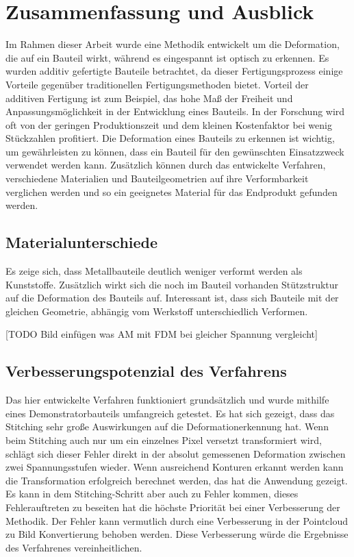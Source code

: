 
\chapter{Zusammenfassung und Ausblick}

Im Rahmen dieser Arbeit wurde eine Methodik entwickelt um 
die Deformation, die auf ein Bauteil wirkt, während es eingespannt 
ist optisch zu erkennen. Es wurden additiv gefertigte Bauteile 
betrachtet, da dieser Fertigungsprozess einige Vorteile gegenüber
traditionellen Fertigungsmethoden bietet. 
Vorteil der additiven Fertigung ist zum Beispiel, das hohe Maß der Freiheit und 
Anpassungsmöglichkeit in der Entwicklung eines Bauteils. In der Forschung 
wird oft von der geringen Produktionszeit und dem kleinen Kostenfaktor 
bei wenig Stückzahlen profitiert. Die Deformation eines Bauteils zu 
erkennen ist wichtig, um gewährleisten zu können, dass ein Bauteil für 
den gewünschten Einsatzzweck verwendet werden kann. Zusätzlich können 
durch das entwickelte Verfahren, verschiedene Materialien und Bauteilgeometrien 
auf ihre Verformbarkeit verglichen werden und so ein geeignetes Material 
für das Endprodukt gefunden werden.

\section{Materialunterschiede}

Es zeige sich, dass Metallbauteile deutlich weniger verformt werden als 
Kunststoffe. Zusätzlich wirkt sich die noch im Bauteil vorhanden Stützstruktur 
auf die Deformation des Bauteils auf. 
Interessant ist, dass sich Bauteile mit der gleichen Geometrie, abhängig vom 
Werkstoff unterschiedlich Verformen. 

[TODO Bild einfügen was AM mit FDM bei gleicher Spannung vergleicht]

\section{Verbesserungspotenzial des Verfahrens}

Das hier entwickelte Verfahren funktioniert grundsätzlich und wurde mithilfe 
eines Demonstratorbauteils umfangreich getestet. Es hat sich gezeigt, dass 
das Stitching sehr große Auswirkungen auf die Deformationerkennung hat. 
Wenn beim Stitching auch nur um ein einzelnes Pixel versetzt transformiert wird,
schlägt sich dieser Fehler direkt in der absolut gemessenen 
Deformation zwischen zwei Spannungsstufen wieder.
Wenn ausreichend Konturen erkannt werden kann die Transformation erfolgreich
berechnet werden, das hat die Anwendung gezeigt. Es kann in dem Stitching-Schritt
aber auch zu Fehler kommen, dieses Fehlerauftreten zu beseiten hat die höchste Priorität 
bei einer Verbesserung der Methodik. 
Der Fehler kann vermutlich durch eine Verbesserung in der Pointcloud zu Bild 
Konvertierung behoben werden. Diese Verbesserung würde die Ergebnisse 
des Verfahrenes vereinheitlichen. 

